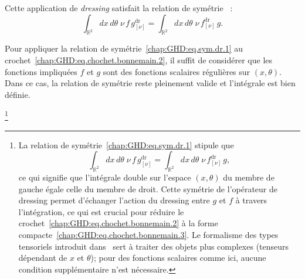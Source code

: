Cette application de \emph{dressing} satisfait la relation de symétrie~\cite{doyon2020lecture} :
\begin{equation}\label{chap:GHD:eq.sym.dr.1}
	\int_{\mathbb{R}^2} dx\, d\theta \; \nu \, f \, g^{\mathrm{dr}}_{[\nu]} 
	= \int_{\mathbb{R}^2} dx\, d\theta \; \nu \, f^{\mathrm{dr}}_{[\nu]} \, g.
\end{equation}


Pour appliquer la relation de symétrie~\eqref{chap:GHD:eq.sym.dr.1} au crochet~\eqref{chap:GHD:eq.chochet.bonnemain.2}, il suffit de considérer que les fonctions impliquées $f$ et $g$ sont des fonctions scalaires régulières sur $(x,\theta)$. Dans ce cas, la relation de symétrie reste pleinement valide et l'intégrale est bien définie.

\footnote{La relation de symétrie~\eqref{chap:GHD:eq.sym.dr.1} stipule que 
\begin{equation*}
\int_{\mathbb{R}^2} dx\, d\theta \; \nu \, f \, g^{\mathrm{dr}}_{[\nu]} 
= \int_{\mathbb{R}^2} dx\, d\theta \; \nu \, f^{\mathrm{dr}}_{[\nu]} \, g,
\end{equation*}
ce qui signifie que l'intégrale double sur l'espace $(x,\theta)$ du membre de gauche égale celle du membre de droit. Cette symétrie de l'opérateur de dressing permet d'échanger l'action du dressing entre $g$ et $f$ à travers l'intégration, ce qui est crucial pour réduire le crochet~\eqref{chap:GHD:eq.chochet.bonnemain.2} à la forme compacte~\eqref{chap:GHD:eq.chochet.bonnemain.3}. Le formalisme des types tensoriels introduit dans~\cite{doyon2020lecture} sert à traiter des objets plus complexes (tenseurs dépendant de $x$ et $\theta$); pour des fonctions scalaires comme ici, aucune condition supplémentaire n'est nécessaire.}


